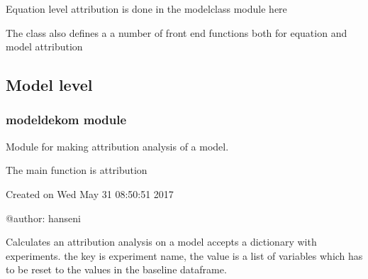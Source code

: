\documentclass[letterpaper,10pt,english]{sphinxmanual}
\begin{document}
\sphinxAtStartPar
Equation level attribution is done in the modelclass module here  {\hyperref[\detokenize{core/modelclass:modelclass.Dekomp_Mixin}]{}}

\sphinxAtStartPar
The class {\hyperref[\detokenize{core/modelclass:modelclass.Dekomp_Mixin}]{}} also defines a a number of front end functions both for equation and model attribution


\subsection{Model level}
\label{\detokenize{attribution/Attribution:model-level}}
\sphinxstepscope


\subsubsection{modeldekom module}
\label{\detokenize{attribution/modeldekom:module-modeldekom}}\label{\detokenize{attribution/modeldekom:modeldekom-module}}\label{\detokenize{attribution/modeldekom::doc}}
\sphinxAtStartPar
Module for making attribution analysis of a model.

\sphinxAtStartPar
The main function is attribution

\sphinxAtStartPar
Created on Wed May 31 08:50:51 2017

\sphinxAtStartPar
@author: hanseni

\begin{fulllineitems}
\label{\detokenize{attribution/modeldekom:modeldekom.attribution}}
\pysigstartsignatures
{}
\pysigstopsignatures
\sphinxAtStartPar
Calculates an attribution analysis on a model
accepts a dictionary with experiments. the key is experiment name, the value is a list
of variables which has to be reset to the values in the baseline dataframe.

\end{fulllineitems}
\end{document}

